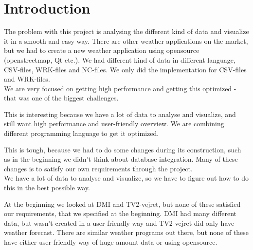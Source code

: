 \chapter{Introduction}



The problem with this project is analysing the different kind of data and visualize it in a smooth and easy way. There are other weather applications on the market, but we had to create a new weather application using opensource (openstreetmap, Qt etc.). We had different kind of data in different language, CSV-files, WRK-files and NC-files. We only did the implementation for CSV-files and WRK-files.\\
We are very focused on getting high performance and getting this optimized - that was one of the biggest challenges.

This is interesting because we have a lot of data to analyse and visualize, and still want high performance and user-friendly overview. We are combining different programming language to get it optimized.

This is tough, because we had to do some changes during its construction, such as in the beginning we didn't think about database integration. Many of these changes is to satisfy our own requirements through the project.\\
We have a lot of data to analyse and visualize, so we have to figure out how to do this in the best possible way.

At the beginning we looked at DMI and TV2-vejret, but none of these satisfied our requirements, that we specified at the beginning. DMI had many different data, but wasn't created in a user-friendly way and TV2-vejret did only have weather forecast. There are similar weather programs out there, but none of these have either user-friendly way of huge amount data or using opensource.



